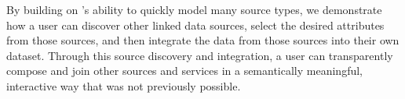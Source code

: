 By building on \karma's ability to quickly model many source types, we demonstrate how a user can discover other linked data sources, select the desired attributes from those sources, and then integrate the data from those sources into their own dataset. 
Through this source discovery and integration, a user can transparently compose and join other sources and services in a semantically meaningful, interactive way that was not previously possible.